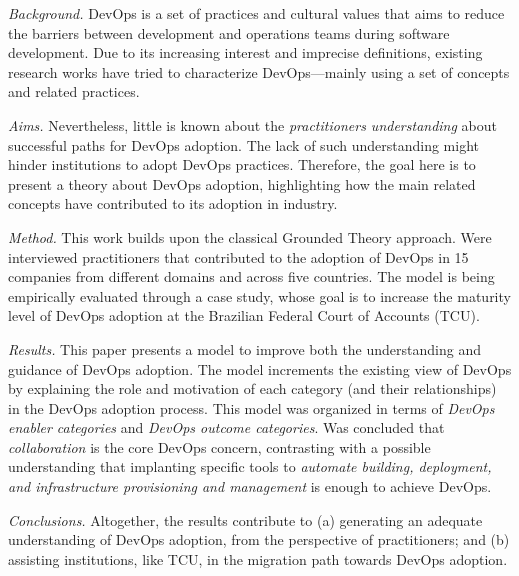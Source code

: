 \emph{Background.} DevOps is a set of practices and cultural values
  that aims to reduce the
  barriers between development and operations
  teams during software development. Due to its increasing interest and imprecise
  definitions, existing research works have tried to
  characterize DevOps---mainly using a set of concepts and related practices.

  \emph{Aims.} Nevertheless, little is
  known about the \emph{practitioners understanding}
  about successful paths for DevOps adoption. The lack of such understanding
  might hinder institutions to adopt DevOps practices. Therefore, the goal
  here is to present a theory about DevOps adoption, highlighting how the
  main related concepts have contributed to its adoption in industry.

  \emph{Method.} This work builds upon the classical Grounded
  Theory approach. Were interviewed practitioners
  that contributed to the adoption of DevOps in 15 companies from different
  domains and across five countries. The model is being empirically evaluated
  through a case study, whose goal is to increase the maturity level of
  DevOps adoption at the Brazilian Federal Court of Accounts (TCU).

  \emph{Results.} This paper
  presents a model to improve both the understanding and guidance
  of DevOps adoption. The model increments the existing view of
  DevOps by explaining the role and motivation of each
  category (and their relationships) in the DevOps adoption process.
  This model was organized in terms of \emph{DevOps enabler categories} and
  \emph{DevOps outcome categories}. Was concluded that
  \emph{collaboration} is the core DevOps concern, contrasting with a possible
  understanding that implanting specific tools to \emph{automate building, deployment,
  and infrastructure provisioning and management} is enough to achieve DevOps.

  \emph{Conclusions.} Altogether, the results contribute to (a) generating
  an adequate understanding of DevOps adoption, from the perspective
  of practitioners; and (b) assisting institutions, like \acrshort{TCU}, in the
  migration path towards DevOps adoption.
